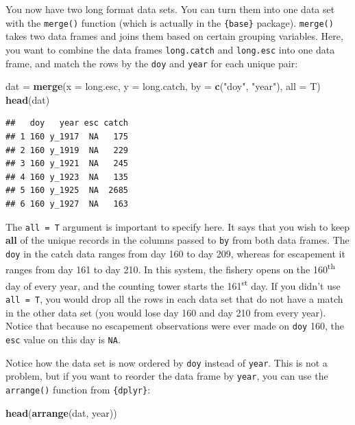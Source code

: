 \documentclass[]{book}
\newenvironment{Shaded}{\begin{snugshade}}{\end{snugshade}}
\newcommand{\KeywordTok}[1]{\textcolor[rgb]{0.13,0.29,0.53}{\textbf{#1}}}
\newcommand{\DataTypeTok}[1]{\textcolor[rgb]{0.13,0.29,0.53}{#1}}
\newcommand{\StringTok}[1]{\textcolor[rgb]{0.31,0.60,0.02}{#1}}
\newcommand{\NormalTok}[1]{#1}
\theoremstyle{definition}
\theoremstyle{definition}
\theoremstyle{definition}
\theoremstyle{remark}
\begin{document}
You now have two long format data sets. You can turn them into one data
set with the \texttt{merge()} function (which is actually in the
\texttt{\{base\}} package). \texttt{merge()} takes two data frames and
joins them based on certain grouping variables. Here, you want to
combine the data frames \texttt{long.catch} and \texttt{long.esc} into
one data frame, and match the rows by the \texttt{doy} and \texttt{year}
for each unique pair:

\begin{Shaded}
\begin{Highlighting}[]
\NormalTok{dat =}\StringTok{ }\KeywordTok{merge}\NormalTok{(}\DataTypeTok{x =}\NormalTok{ long.esc, }\DataTypeTok{y =}\NormalTok{ long.catch,}
            \DataTypeTok{by =} \KeywordTok{c}\NormalTok{(}\StringTok{"doy"}\NormalTok{, }\StringTok{"year"}\NormalTok{), }\DataTypeTok{all =}\NormalTok{ T)}
\KeywordTok{head}\NormalTok{(dat)}
\end{Highlighting}
\end{Shaded}

\begin{verbatim}
##   doy   year esc catch
## 1 160 y_1917  NA   175
## 2 160 y_1919  NA   229
## 3 160 y_1921  NA   245
## 4 160 y_1923  NA   135
## 5 160 y_1925  NA  2685
## 6 160 y_1927  NA   163
\end{verbatim}

The \texttt{all\ =\ T} argument is important to specify here. It says
that you wish to keep \textbf{all} of the unique records in the columns
passed to \texttt{by} from both data frames. The \texttt{doy} in the
catch data ranges from day 160 to day 209, whereas for escapement it
ranges from day 161 to day 210. In this system, the fishery opens on the
160\textsuperscript{th} day of every year, and the counting tower starts
the 161\textsuperscript{st} day. If you didn't use \texttt{all\ =\ T},
you would drop all the rows in each data set that do not have a match in
the other data set (you would lose day 160 and day 210 from every year).
Notice that because no escapement observations were ever made on
\texttt{doy} 160, the \texttt{esc} value on this day is \texttt{NA}.

Notice how the data set is now ordered by \texttt{doy} instead of
\texttt{year}. This is not a problem, but if you want to reorder the
data frame by \texttt{year}, you can use the \texttt{arrange()} function
from \texttt{\{dplyr\}}:

\begin{Shaded}
\begin{Highlighting}[]
\KeywordTok{head}\NormalTok{(}\KeywordTok{arrange}\NormalTok{(dat, year))}
\end{Highlighting}
\end{Shaded}
\end{document}
